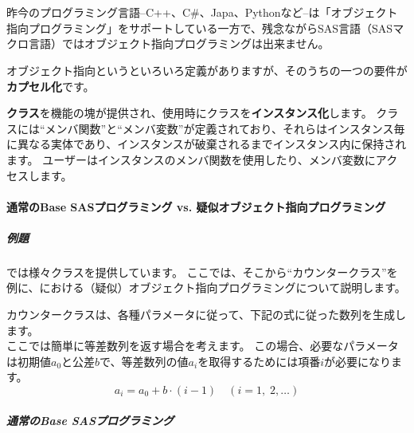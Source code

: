 \chapter{\DocStrTitleRDMQuasiOOP}
 
\section{\DocStrTitleRDMWhatIsQuasiOOP}
昨今のプログラミング言語--C++、C\#、Japa、Pythonなど--は「オブジェクト指向プログラミング」をサポートしている一方で、残念ながらSAS言語（SASマクロ言語）ではオブジェクト指向プログラミングは出来ません。
 
オブジェクト指向というといろいろ定義がありますが、そのうちの一つの要件が{\bfseries カプセル化}です。
 
{\bfseries クラス}を機能の塊が提供され、使用時にクラスを{\bfseries インスタンス化}します。
クラスには``メンバ関数''と``メンバ変数''が定義されており、それらはインスタンス毎に異なる実体であり、インスタンスが破棄されるまでインスタンス内に保持されます。
ユーザーはインスタンスのメンバ関数を使用したり、メンバ変数にアクセスします。
 
\subsubsection{通常のBase SASプログラミング vs. 疑似オブジェクト指向プログラミング}
\paragraph{例題}
\RDM では様々クラスを提供しています。
ここでは、そこから``カウンタークラス''を例に、\RDM における（疑似）オブジェクト指向プログラミングについて説明します。
 
カウンタークラスは、各種パラメータに従って、下記の式に従った数列を生成します。
\begin{equation}
\end{equation}
ここでは簡単に等差数列を返す場合を考えます。
この場合、必要なパラメータは初期値$a_0$と公差$b$で、等差数列の値$a_i$を取得するためには項番$i$が必要になります。
\begin{equation}
a_i = a_0 + b\cdot(i - 1)\quad(i = 1,\;2,\ldots)
\end{equation}
 
\paragraph{通常のBase SASプログラミング}
 
